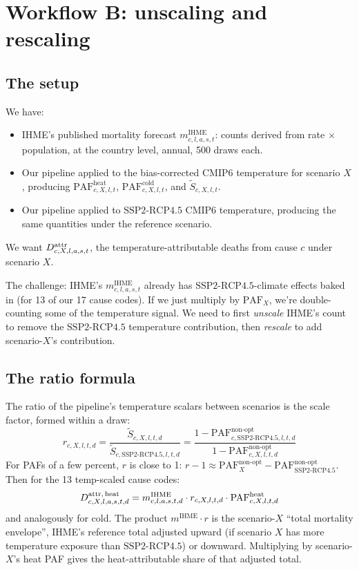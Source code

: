\documentclass[11pt]{article}
\newcommand{\PAF}{\text{PAF}}
\newcommand{\SSPtwo}{\text{SSP2{-}RCP4.5}}
\newcommand{\mIHME}{m^{\text{IHME}}}
\begin{document}
\section{Workflow B: unscaling and rescaling}
\label{sec:workflowb}

\subsection{The setup}

We have:
\begin{itemize}[itemsep=2pt]
  \item IHME's published mortality forecast $\mIHME_{c,l,a,s,t}$:
    counts derived from rate $\times$ population, at the country level,
    annual, 500 draws each.
  \item Our pipeline applied to the bias-corrected CMIP6 temperature for
    scenario $X$, producing $\PAF^{\text{heat}}_{c,X,l,t}$,
    $\PAF^{\text{cold}}_{c,X,l,t}$, and $\tilde S_{c,X,l,t}$.
  \item Our pipeline applied to $\SSPtwo$ CMIP6 temperature, producing
    the same quantities under the reference scenario.
\end{itemize}

We want $\mAttr_{c,X,l,a,s,t}$, the temperature-attributable deaths from
cause $c$ under scenario $X$.

The challenge: IHME's $\mIHME_{c,l,a,s,t}$ already has $\SSPtwo$-climate
effects baked in (for 13 of our 17 cause codes). If we just multiply by
$\PAF_X$, we're double-counting some of the temperature signal. We need
to first \emph{unscale} IHME's count to remove the $\SSPtwo$ temperature
contribution, then \emph{rescale} to add scenario-$X$'s contribution.

\subsection{The ratio formula}

The ratio of the pipeline's temperature scalars between scenarios is
the scale factor, formed within a draw:
\begin{equation}
r_{c,X,l,t,d} = \frac{\tilde S_{c,X,l,t,d}}{\tilde S_{c,\SSPtwo,l,t,d}}
= \frac{1 - \PAF^{\text{non-opt}}_{c,\SSPtwo,l,t,d}}{1 - \PAF^{\text{non-opt}}_{c,X,l,t,d}}
\label{eq:ratio}
\end{equation}
For PAFs of a few percent, $r$ is close to 1: $r - 1 \approx
\PAF^{\text{non-opt}}_X - \PAF^{\text{non-opt}}_{\SSPtwo}$. Then for the
13 temp-scaled cause codes:
\begin{equation}
\mAttr[heat]_{c,X,l,a,s,t,d} = \mIHME_{c,l,a,s,t,d} \cdot r_{c,X,l,t,d} \cdot \PAF^{\text{heat}}_{c,X,l,t,d}
\label{eq:wb-12}
\end{equation}
and analogously for cold. The product $\mIHME \cdot r$ is the
scenario-$X$ ``total mortality envelope'', IHME's reference total
adjusted upward (if scenario $X$ has more temperature exposure than
$\SSPtwo$) or downward. Multiplying by scenario-$X$'s heat PAF gives the
heat-attributable share of that adjusted total.
\end{document}
